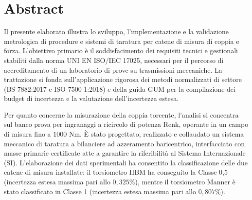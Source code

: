 \documentclass[a4paper, twoside]{article}
\newcommand\blankpage{%
    \null
    \thispagestyle{empty}%
    \addtocounter{page}{-1}%
    \newpage}
\begin{document}
\newpage

    \tableofcontents
    \thispagestyle{empty}

    \newpage
    \listoffigures
    \thispagestyle{empty}

    \newpage
    \listoftables
    \thispagestyle{empty}

    \newpage

	\setcounter{page}{1}

    \blankpage
    \newpage


\section*{Abstract}

Il presente elaborato illustra lo sviluppo, l'implementazione e la validazione metrologica di procedure e sistemi di taratura per catene di misura di coppia e forza. L'obiettivo primario è il soddisfacimento dei requisiti tecnici e gestionali stabiliti dalla norma UNI EN ISO/IEC 17025, necessari per il percorso di accreditamento di un laboratorio di prove su trasmissioni meccaniche. La trattazione si fonda sull'applicazione rigorosa dei metodi normalizzati di settore (BS 7882:2017 e ISO 7500-1:2018) e della guida GUM per la compilazione dei budget di incertezza e la valutazione dell'incertezza estesa.\par

Per quanto concerne la misurazione della coppia torcente, l'analisi si concentra sul banco prova per ingranaggi a ricircolo di potenza Renk, operante in un campo di misura fino a $1000 \text{ Nm}$. È stato progettato, realizzato e collaudato un sistema meccanico di taratura a bilanciere ad azzeramento baricentrico, interfacciato con masse primarie certificate atte a garantire la riferibilità al Sistema Internazionale (SI). L'elaborazione dei dati sperimentali ha consentito la classificazione delle due catene di misura installate: il torsiometro HBM ha conseguito la Classe 0,5 (incertezza estesa massima pari allo $0,325\%$), mentre il torsiometro Manner è stato classificato in Classe 1 (incertezza estesa massima pari allo $0,807\%$).\par
\end{document}
